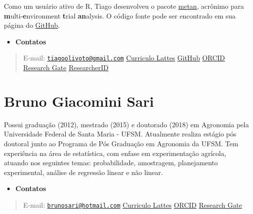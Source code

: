 \documentclass[
]{book}
\providecommand{\tightlist}{%
  \setlength{\itemsep}{0pt}\setlength{\parskip}{0pt}}
\begin{document}
Como um usuário ativo de R, Tiago desenvolveu o pacote \href{https://tiagoolivoto.github.io/metan/}{metan}, acrônimo para \textbf{m}ulti-\textbf{e}nvironment \textbf{t}rial \textbf{an}alysis. O código fonte pode ser encontrado em sua página do \href{https://github.com/TiagoOlivoto/metan}{GitHub}.

\begin{itemize}
\tightlist
\item
  \textbf{Contatos}
\end{itemize}

\begin{quote}
E-mail: \href{mailto:tiagoolivoto@gmail.com}{\nolinkurl{tiagoolivoto@gmail.com}} \textbar{} \href{http://buscatextual.cnpq.br/buscatextual/visualizacv.do?id=K4416862T6}{Curriculo Lattes} \textbar{} \href{https://github.com/TiagoOlivoto}{GitHub} \textbar{} \href{https://orcid.org/0000-0002-0241-9636}{ORCID} \textbar{} \href{https://www.researchgate.net/profile/Tiago_Olivoto2}{Research Gate} \textbar{} \href{https://publons.com/researcher/1431679/tiago-olivoto/}{ResearcherID}
\end{quote}

\hypertarget{bruno-giacomini-sari}{%
\section*{Bruno Giacomini Sari}\label{bruno-giacomini-sari}}

Possui graduação (2012), mestrado (2015) e doutorado (2018) em Agronomia pela Universidade Federal de Santa Maria - UFSM. Atualmente realiza estágio pós doutoral junto ao Programa de Pós Graduação em Agronomia da UFSM. Tem experiência na área de estatística, com enfase em experimentação agrícola, atuando nos seguintes temas: probabilidade, amostragem, planejamento experimental, análise de regressão linear e não linear.

\begin{itemize}
\tightlist
\item
  \textbf{Contatos}
\end{itemize}

\begin{quote}
E-mail: \href{mailto:brunosari@hotmail.com}{\nolinkurl{brunosari@hotmail.com}} \textbar{} \href{http://buscatextual.cnpq.br/buscatextual/visualizacv.do?id=K4406856U6}{Curriculo Lattes} \textbar{} \href{https://orcid.org/0000-0003-3405-9628}{ORCID} \textbar{} \href{https://www.researchgate.net/profile/Bruno_Sari}{Research Gate}
\end{quote}
\end{document}
